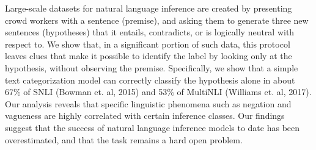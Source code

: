 Large-scale datasets for natural language inference are created by presenting crowd workers with a sentence (premise), and asking them to generate three new sentences (hypotheses) that it entails, contradicts, or is logically neutral with respect to. We show that, in a significant portion of such data, this protocol leaves clues that make it possible to identify the label by looking only at the hypothesis, without observing the premise. Specifically, we show that a simple text categorization model can correctly classify the hypothesis alone in about 67\% of SNLI (Bowman et. al, 2015) and 53\% of MultiNLI (Williams et. al, 2017). Our analysis reveals that specific linguistic phenomena such as negation and vagueness are highly correlated with certain inference classes. Our findings suggest that the success of natural language inference models to date has been overestimated, and that the task remains a hard open problem.
